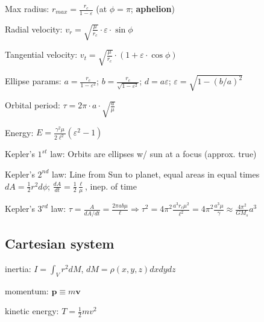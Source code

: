 \documentclass[letterpaper,landscape,10pt]{article}
\newenvironment{mydescription}
{\begin{description}
	\setlength{\itemsep}{0pt}
	\setlength{\parskip}{0pt}
	\setlength{\parsep}{-1pt}}
{\end{description}}
\begin{document}
{\begin{multicols}{3}
\begin{mydescription}
		  \item[Max radius:] $r_{max}=\frac{r_c}{1-\varepsilon}$ (at $\phi=\pi$; \textbf{aphelion})
		  \item[Radial velocity:]$v_r = \sqrt{\frac{\mu}{r_c}}\cdot\varepsilon\cdot\sin\phi$
		  \item[Tangential velocity:]$v_t = \sqrt{\frac{\mu}{r_c}}\cdot\left(1+\varepsilon\cdot\cos\phi\right)$
		  \item[Ellipse params:] $a=\frac{r_c}{1-\varepsilon^2}$; $b=\frac{r_c}{\sqrt{1-\varepsilon^2}}$; $d=a\varepsilon$; $\varepsilon=\sqrt{1-(b/a)^2}$
		  \item[Orbital period:] $\tau=2\pi\cdot a\cdot\sqrt{\frac{a}{\mu}}$
		  \item[Energy:] $E=\frac{\gamma^2\mu}{2\ell^2}(\varepsilon^2-1)$
		  \item[Kepler's $1^{st}$ law:] Orbits are ellipses w/ sun at a focus (approx. true)
		  \item[Kepler's $2^{nd}$ law:] Line from Sun to planet, equal areas in equal times\\
			$dA=\frac{1}{2}r^2d\phi$; $\frac{dA}{dt}=\frac{1}{2}\frac{\ell}{\mu}$, inep. of time
		  \item[Kepler's $3^{rd}$ law:] $\tau=\frac{A}{dA/dt}=\frac{2\pi ab\mu}{\ell} \Rightarrow \tau^2=4\pi^2\frac{a^3r_c\mu^2}{\ell^2}=4\pi^2\frac{a^3\mu}{\gamma}\approx \frac{4\pi^2}{GM_s}a^3$
		\end{mydescription}

	\subsection*{Cartesian system}
		\begin{mydescription}
			\item[inertia:] $I = \int_V r^2 dM$, $dM = \rho(x,y,z)dx dy dz$
			\item[momentum:] $\mathbf{p}\equiv m\mathbf{v}$
			\item[kinetic energy:] $T = \frac{1}{2}mv^2$
		\end{mydescription}
	

\end{multicols}}
\end{document}
